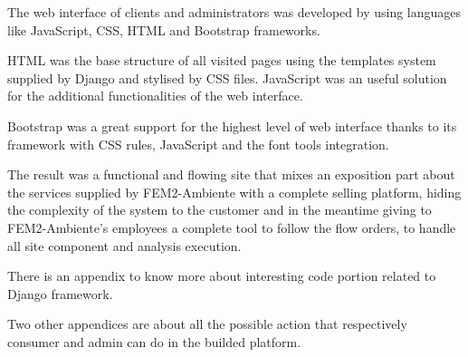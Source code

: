 \documentclass[12pt,a4paper]{scrartcl}
\def \fem {FEM2-Ambiente}
\def \js {JavaScript}
\begin{document}
The web interface of clients and administrators was developed by using languages like {\js}, CSS, HTML and Bootstrap frameworks.

HTML was the base structure of all visited pages using the templates system supplied by Django and stylised by CSS files. {\js} was an useful solution for the additional functionalities of the web interface.

Bootstrap was a great support for the highest level of web interface thanks to its framework with CSS rules, {\js} and the font tools integration.

The result was a functional and flowing site that mixes an exposition part about the services supplied by {\fem} with a complete selling platform, hiding the complexity of the system to the customer and in the meantime giving to {\fem}’s employees a complete tool to follow the flow orders, to handle all site component and analysis execution.

There is an appendix to know more about interesting code portion related to Django framework.

Two other appendices are about all the possible action that respectively consumer and admin can do in the builded platform.
\end{document}
